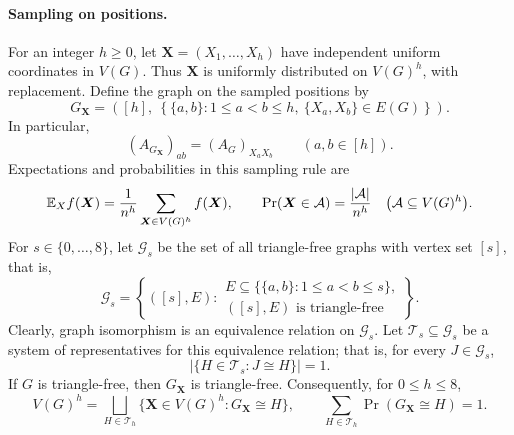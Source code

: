 \paragraph{Sampling on positions.}
For an integer $h\geq0$, let $\boldsymbol{X}=(X_1,\ldots,X_h)$ have independent
uniform coordinates in $V(G)$.
Thus $\boldsymbol{X}$ is uniformly distributed on $V(G)^h$, with replacement.
Define the graph on the sampled positions by
\begin{equation}\label{eq:sampled-position-graph}
G_{\boldsymbol{X}}=\left([h],\
\left\{\{a,b\}:1\leq a<b\leq h,
\ \{X_a,X_b\}\in E(G)\right\}\right).
\end{equation}
In particular,
\begin{equation}\label{eq:sampled-adjacency}
(A_{G_{\boldsymbol{X}}})_{ab}=(A_G)_{X_aX_b}
\qquad(a,b\in[h]).
\end{equation}
Expectations and probabilities in this sampling rule are
\begin{equation}\label{eq:sampled-expectation}
\mathbb E_Xf(\boldsymbol{X})=\frac1{n^h}\sum_{\boldsymbol{X}\in V(G)^h}f(\boldsymbol{X}),
\qquad
\Pr(\boldsymbol{X}\in\mathcal A)=\frac{|\mathcal A|}{n^h}
\quad\big(\mathcal A\subseteq V(G)^h\big).
\end{equation}
For $s\in\{0,\ldots,8\}$, let $\mathcal G_s$ be the set of all
triangle-free graphs with vertex set $[s]$, that is,
\begin{equation}\label{eq:triangle-free-labeled-graphs}
\mathcal G_s=
\left\{([s],E):
\begin{array}{l}
E\subseteq\{\{a,b\}:1\leq a<b\leq s\},\\
([s],E)\text{ is triangle-free}
\end{array}\right\}.
\end{equation}
Clearly, graph isomorphism is an equivalence relation on $\mathcal G_s$.
Let $\mathcal T_s\subseteq\mathcal G_s$ be a system of representatives
for this equivalence relation; that is, for every $J\in\mathcal G_s$,
\begin{equation}\label{eq:triangle-free-representatives}
\big|\{H\in\mathcal T_s:J\cong H\}\big|=1.
\end{equation}
If $G$ is triangle-free, then $G_{\boldsymbol{X}}$ is triangle-free.
Consequently, for $0\leq h\leq8$,
\begin{equation}\label{eq:sampled-graph-partition}
V(G)^h=
\bigsqcup_{H\in\mathcal T_h}
\{\boldsymbol{X}\in V(G)^h:G_{\boldsymbol{X}}\cong H\},
\qquad
\sum_{H\in\mathcal T_h}\Pr(G_{\boldsymbol{X}}\cong H)=1.
\end{equation}

